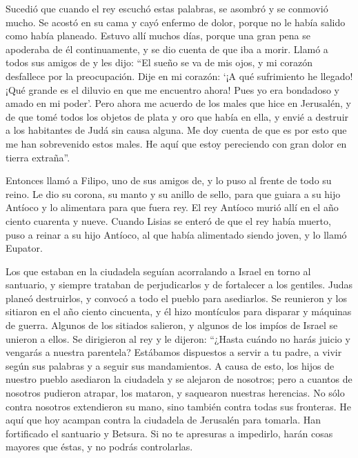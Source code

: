  Sucedió que cuando el rey escuchó estas palabras, se
asombró y se conmovió mucho. Se acostó en su cama y cayó enfermo de
dolor, porque no le había salido como había planeado. 
Estuvo allí muchos días, porque una gran pena se apoderaba de él
continuamente, y se dio cuenta de que iba a morir.  Llamó
a todos sus amigos de y les dijo: ``El sueño se va de mis ojos, y mi
corazón desfallece por la preocupación.  Dije en mi
corazón: `¡A qué sufrimiento he llegado! ¡Qué grande es el diluvio en
que me encuentro ahora! Pues yo era bondadoso y amado en mi poder'.
 Pero ahora me acuerdo de los males que hice en
Jerusalén, y de que tomé todos los objetos de plata y oro que había en
ella, y envié a destruir a los habitantes de Judá sin causa alguna.
 Me doy cuenta de que es por esto que me han sobrevenido
estos males. He aquí que estoy pereciendo con gran dolor en tierra
extraña''.

 Entonces llamó a Filipo, uno de sus amigos de, y lo puso
al frente de todo su reino.  Le dio su corona, su manto y
su anillo de sello, para que guiara a su hijo Antíoco y lo alimentara
para que fuera rey.  El rey Antíoco murió allí en el año
ciento cuarenta y nueve.  Cuando Lisias se enteró de que
el rey había muerto, puso a reinar a su hijo Antíoco, al que había
alimentado siendo joven, y lo llamó Eupator.

 Los que estaban en la ciudadela seguían acorralando a
Israel en torno al santuario, y siempre trataban de perjudicarlos y de
fortalecer a los gentiles.  Judas planeó destruirlos, y
convocó a todo el pueblo para asediarlos.  Se reunieron y
los sitiaron en el año ciento cincuenta, y él hizo montículos para
disparar y máquinas de guerra.  Algunos de los sitiados
salieron, y algunos de los impíos de Israel se unieron a ellos.
 Se dirigieron al rey y le dijeron: ``¿Hasta cuándo no
harás juicio y vengarás a nuestra parentela?  Estábamos
dispuestos a servir a tu padre, a vivir según sus palabras y a seguir
sus mandamientos.  A causa de esto, los hijos de nuestro
pueblo asediaron la ciudadela y se alejaron de nosotros; pero a cuantos
de nosotros pudieron atrapar, los mataron, y saquearon nuestras
herencias.  No sólo contra nosotros extendieron su mano,
sino también contra todas sus fronteras.  He aquí que hoy
acampan contra la ciudadela de Jerusalén para tomarla. Han fortificado
el santuario y Betsura.  Si no te apresuras a impedirlo,
harán cosas mayores que éstas, y no podrás controlarlas.

